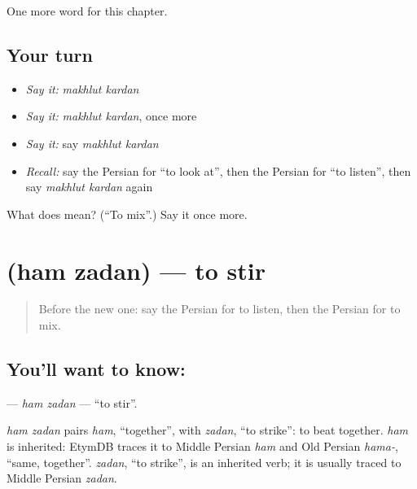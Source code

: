 \begin{grammarlens}[title={What you've built}]
One more word for this chapter.
\end{grammarlens}

\subsection*{Your turn}
\begin{itemize}
\raggedright
  \item \emph{Say it:} \emph{makhlut kardan}
  \item \emph{Say it:} \emph{makhlut kardan}, once more
  \item \emph{Say it:} say \emph{makhlut kardan}
  \item \emph{Recall:} say the Persian for \textquotedblleft{}to look at\textquotedblright{}, then the Persian for \textquotedblleft{}to listen\textquotedblright{}, then say \emph{makhlut kardan} again
\end{itemize}

\begin{tcolorbox}[breakable,colback=teal!4,colframe=teal!35!black,title={Before you move on}]
What does   mean? (\textquotedblleft{}To mix\textquotedblright{}.) Say it once more.
\end{tcolorbox}
\section[\texorpdfstring{\fa{هم} \fa{زدن} (ham zadan)}{هم زدن (ham zadan)}]{  (ham zadan) — to stir}

\label{lesson:FA-C180-ham-zadan}



\begin{quote}
Before the new one: say the Persian for to listen, then the Persian for to mix.
\end{quote}

\subsection*{You'll want to know:  }
\textbf{ } — \emph{ham zadan} — \textquotedblleft{}to stir\textquotedblright{}.

\begin{cousinweb}
\emph{ham zadan} pairs \emph{ham}, \textquotedblleft{}together\textquotedblright{}, with \emph{zadan}, \textquotedblleft{}to strike\textquotedblright{}: to beat together. \emph{ham} is inherited: EtymDB traces it to Middle Persian \emph{ham} and Old Persian \emph{hama-}, \textquotedblleft{}same, together\textquotedblright{}. \emph{zadan}, \textquotedblleft{}to strike\textquotedblright{}, is an inherited verb; it is usually traced to Middle Persian \emph{zadan}.
\end{cousinweb}

